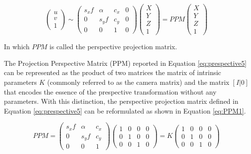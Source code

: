 \begin{equation} 
    \label{eq:prespective5}
    \begin{pmatrix}
    u \\ 
    v \\ 
    1
    \end{pmatrix}
    \sim
    \begin{pmatrix}
    s_x f & \alpha & c_x & 0 \\ 
    0 & s_y f & c_y & 0 \\ 
    0 & 0 & 1 & 0
    \end{pmatrix}
    \begin{pmatrix}
    X \\ 
    Y \\ 
    Z \\ 
    1
    \end{pmatrix}
    = 
    PPM
    \begin{pmatrix}
      X \\ 
      Y \\ 
      Z \\ 
      1
      \end{pmatrix}
  \end{equation}

In which $PPM$ is called the perspective projection matrix.

The Projection Perspective Matrix (PPM) reported in Equation \ref{eq:prespective5} can be represented as the product of two matrices  the matrix of intrinsic parameters $K$ (commonly referred to as the camera matrix) and the matrix $[I | 0]$ that encodes the essence of the prespective transformation without any parameters.
With this distinction, the perspective projection matrix defined in Equation \ref{eq:prespective5} can be reformulated as shown in Equation \ref{eq:PPM1}.

\begin{equation} 
    \label{eq:PPM1}
    PPM = 
    \begin{pmatrix}
    s_x f & \alpha & c_x \\ 
    0 & s_y f & c_y \\ 
    0 & 0 & 1 
    \end{pmatrix}
    \begin{pmatrix}
      1 & 0 & 0 & 0 \\ 
      0 & 1 & 0 & 0 \\ 
      0 & 0 & 1 & 0
      \end{pmatrix}
    = K
    \begin{pmatrix}
      1 & 0 & 0 & 0 \\ 
      0 & 1 & 0 & 0 \\ 
      0 & 0 & 1 & 0
      \end{pmatrix}
\end{equation}

